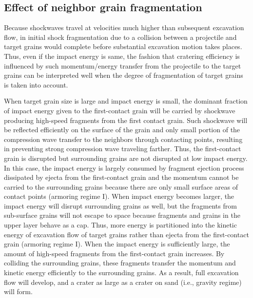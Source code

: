 \documentclass[3p,authoryear]{elsarticle}
\newcommand{\II}{I\hspace{-.1 em}I}
\begin{document}
\subsection{Effect of neighbor grain fragmentation}\label{sec:mechanism}
Because shockwaves travel at velocities much higher than subsequent excavation flow, in initial shock fragmentation due to a collision between a projectile and target grains would complete before substantial excavation motion takes places.
Thus, even if the impact energy is same, the fashion that cratering efficiency is influenced by such momentum/energy transfer from the projectile to the target grains can be interpreted well when the degree of fragmentation of target grains is taken into account.

When target grain size is large and impact energy is small, the dominant fraction of impact energy given to the first-contact grain will be carried by shockwave producing high-speed fragments from the first contact grain.
Such shockwave will be reflected efficiently on the surface of the grain and only small portion of the compression wave transfer to the neighbors through contacting points, resulting in preventing strong compression wave traveling farther.
Thus, the first-contact grain is disrupted but surrounding grains are not disrupted at low impact energy. In this case, the impact energy is largely consumed by fragment ejection process dissipated by ejecta from the first-contact grain and the momentum cannot be carried to the surrounding grains because there are only small surface areas of contact points (armoring regime I).
When impact energy becomes larger, the impact energy will disrupt surrounding grains as well, but the fragments from sub-surface grains will not escape to space because fragments and grains in the upper layer behave as a cap.
Thus, more energy is partitioned into the kinetic energy of excavation flow of target grains rather than ejecta from the first-contact grain (armoring regime I).
When the impact energy is sufficiently large, the amount of high-speed fragments from the first-contact grain increases.
By colliding the surrounding grains, these fragments transfer the momentum and kinetic energy efficiently to the surrounding grains.
As a result, full excavation flow will develop, and a crater as large as a crater on sand (i.e., gravity regime) will form.
\end{document}
